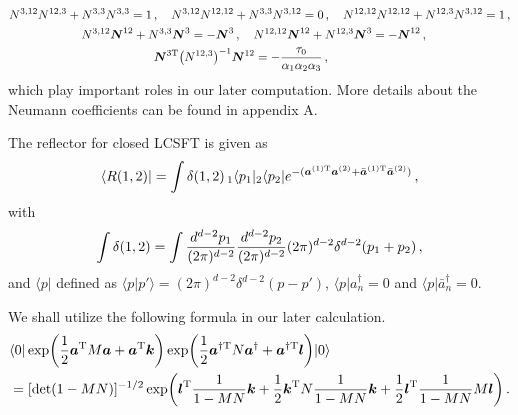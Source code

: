 \documentclass[12pt]{article}
\begin{document}
\begin{align}
&N^{3,12}N^{12,3}+N^{3,3}N^{3,3}=1\,,\quad
N^{3,12}N^{12,12}+N^{3,3}N^{3,12}=0\,,\quad
N^{12,12}N^{12,12}+N^{12,3}N^{3,12}=1\,,\nonumber\\
&\qquad\qquad\qquad
N^{3,12}\boldsymbol{N}^{12}+N^{3,3}\boldsymbol{N}^{3}
=-\boldsymbol{N}^{3}\,,\quad
N^{12,12}\boldsymbol{N}^{12}+N^{12,3}\boldsymbol{N}^{3}
=-\boldsymbol{N}^{12}\,,\nonumber\\
&\qquad\qquad\qquad\qquad\qquad\qquad
\boldsymbol{N}^{3{\rm T}}\bigl(N^{12,3}\bigr)^{-1}\boldsymbol{N}^{12}
=-\frac{\tau_0}{\alpha_1\alpha_2\alpha_3}\,,
\label{NN}
\end{align}
which play important roles in our later computation.
More details about the Neumann coefficients can be found in appendix
A.

The reflector for closed LCSFT is given as
\begin{align}
\langle R(1,2)|=\int\delta(1,2)
\,{}_1\langle p_1|{}_2\langle p_2|
e^{-(\boldsymbol{a}^{(1){\rm T}}\boldsymbol{a}^{(2)}
+\bar{\boldsymbol{a}}^{(1){\rm T}}\bar{\boldsymbol{a}}^{(2)})}\,,
\end{align}
with 
\begin{align}
\int\delta(1,2)=\int
{d^{d-2}p_1 \over (2\pi)^{d-2}}
{d^{d-2}p_2 \over (2\pi)^{d-2}}
(2\pi)^{d-2}\delta^{d-2}(p_1+p_2)\,,
\end{align}
and $\langle p|$ defined as 
$\langle p|p'\rangle=(2\pi)^{d-2}\delta^{d-2}(p-p')$,
$\langle p|a^{\dagger}_n=0$ and $\langle p|\bar{a}^{\dagger}_n=0$.

We shall utilize the following formula in our later calculation.
\begin{align}
&\langle 0|\exp\biggl(\frac{1}{2}\boldsymbol{a}^{\rm T}
M\boldsymbol{a}
+\boldsymbol{a}^{\rm T}\boldsymbol{k}\biggr)
\exp\biggl(\frac{1}{2}\boldsymbol{a}^{\dagger{\rm T}}
N\boldsymbol{a}^\dagger
+\boldsymbol{a}^{\dagger{\rm T}}\boldsymbol{l}\biggr)
|0\rangle\nonumber\\
&=[\det(1-MN)]^{-1/2}
\exp\biggl(\boldsymbol{l}^{\rm T}\frac{1}{1-MN}\boldsymbol{k}
+\frac{1}{2}\boldsymbol{k}^{\rm T}N\frac{1}{1-MN}\boldsymbol{k}
+\frac{1}{2}\boldsymbol{l}^{\rm T}\frac{1}{1-MN}M\boldsymbol{l}
\biggl)\,.
\label{product}
\end{align}
\end{document}
